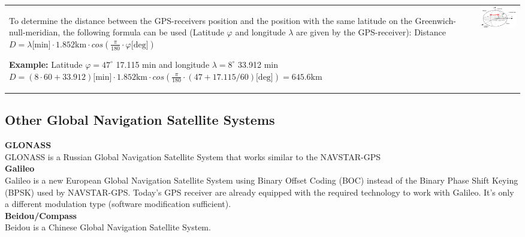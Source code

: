 	\begin{tabular}{ll}
		\parbox{11cm}{
			To determine the distance between the GPS-receivers position and the position with the same 
			latitude on the Greenwich-null-meridian, the following formula can be used 
			(Latitude $\varphi$ and longitude $\lambda$ are given by the GPS-receiver):\\
			Distance $D = \lambda \text{[min]} \cdot 1.852 \text{km} \cdot cos(\frac{\pi}{180}\cdot \varphi \text{[deg]}) $ \\
			
			\textbf{Example:}
			Latitude $\varphi = 47^\circ$ 17.115 min and longitude $\lambda = 8^\circ$ 33.912 min \\
			$D = (8\cdot 60 + 33.912) \text{[min]} \cdot 1.852 \text{km} \cdot cos(\frac{\pi}{180}\cdot (47 + 17.115/60) \text{[deg]}) = 645.6$km
		}	
		& \parbox{7cm}{
			\includegraphics[width=7cm]{./bilder/gps-distance.png}\\ 
		}
	\end{tabular}


\subsection{Other Global Navigation Satellite Systems}
\textbf{GLONASS} \\
	GLONASS is a Russian Global Navigation Satellite System that works similar to the NAVSTAR-GPS \\
\textbf{Galileo} \\
	Galileo is a new European Global Navigation Satellite System using Binary Offset Coding (BOC) instead of the Binary Phase Shift Keying (BPSK) 
	used by NAVSTAR-GPS. Today's GPS receiver are already equipped with the required technology to work with Galileo. It's only a 
	different modulation type (software modification sufficient). \\
\textbf{Beidou/Compass} \\
	Beidou is a Chinese Global Navigation Satellite System.
	